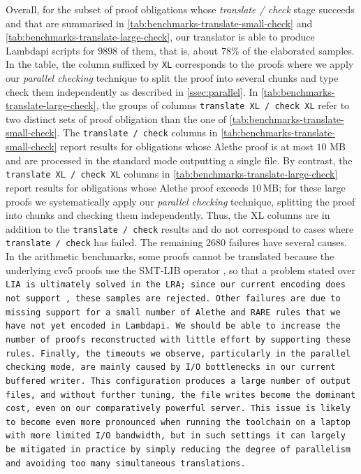 Overall, for the subset of proof obligations whose \emph{translate / check} stage succeeds and that are summarised in \cref{tab:benchmarks-translate-small-check} and \cref{tab:benchmarks-translate-large-check}, our translator is able to produce Lambdapi scripts for $9898$ of them, that is, about $78\%$ of the elaborated samples.
In the table, the column suffixed by \texttt{XL} corresponds to the proofs where we apply our \emph{parallel checking} technique to split the proof into several chunks and type check them independently as described in \cref{ssec:parallel}.
In \cref{tab:benchmarks-translate-large-check}, the groups of columns \texttt{translate XL / check XL} refer to two distinct sets of proof obligation than the one of \cref{tab:benchmarks-translate-small-check}.
The \texttt{translate / check} columns in \cref{tab:benchmarks-translate-small-check} report results for obligations whose Alethe proof is at most $10$ MB and are processed in the standard mode outputting a single file.
By contrast, the \texttt{translate XL / check XL} columns in \cref{tab:benchmarks-translate-large-check} report results for obligations whose Alethe proof exceeds $10$\,MB; for these large proofs we systematically apply our \emph{parallel checking} technique, splitting the proof into chunks and checking them independently.
Thus, the XL columns are in addition to the \texttt{translate / check} results and do not correspond to cases where \texttt{translate / check} has failed.
The remaining $2680$ failures have several causes. In the arithmetic benchmarks, some proofs cannot be translated because the underlying cvc5 proofs use the SMT-LIB operator , so that a problem stated over \tt{LIA} is ultimately solved in the \tt{LRA}; since our current encoding does not support , these samples are rejected.
Other failures are due to missing support for a small number of Alethe and RARE rules that we have not yet encoded in Lambdapi.
We should be able to increase the number of proofs reconstructed with little effort by supporting these rules.
Finally, the timeouts we observe, particularly in the parallel checking mode, are mainly caused by I/O bottlenecks in our current buffered writer. This configuration produces a large number of output files, and without further tuning, the file writes become the dominant cost, even on our comparatively powerful server.
This issue is likely to become even more pronounced when running the toolchain on a laptop with more limited I/O bandwidth, but in such settings it can largely be mitigated in practice by simply reducing the degree of parallelism and avoiding too many simultaneous translations.

